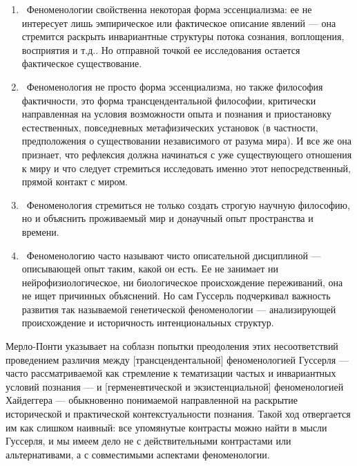 \documentclass[11pt]{book}
\begin{document}
\begin{enumerate}
  \item\ Феноменологии свойственна некоторая форма эссенциализма: ее не интересует лишь эмпирическое или фактическое описание явлений --- она стремится раскрыть инвариантные структуры потока сознания, воплощения, восприятия и т.д.. Но отправной точкой ее исследования остается фактическое существование.
  \item\ Феноменология не просто форма эссенциализма, но также философия фактичности, это форма трансцендентальной философии, критически направленная на условия возможности опыта и познания и приостановку естественных, повседневных метафизических установок (в частности, предположения о существовании независимого от разума мира). И все же она признает, что рефлексия должна начинаться с уже существующего отношения к миру и что следует стремиться исследовать именно этот непосредственный, прямой контакт с миром.
  \item\ Феноменология стремиться не только создать строгую научную философию, но и объяснить проживаемый мир и донаучный опыт пространства и времени.
  \item\ Феноменологию часто называют чисто описательной дисциплиной --- описывающей опыт таким, какой он есть. Ее не занимает ни нейрофизиологическое, ни биологическое происхождение переживаний, она не ищет причинных объяснений. Но сам Гуссерль подчеркивал важность развития так называемой генетической феноменологии --- анализирующей происхождение и историчность интенциональных структур.
\end{enumerate}

Мерло-Понти указывает на соблазн попытки преодоления этих несоответствий проведением различия между [трансцендентальной] феноменологией Гуссерля --- часто рассматриваемой как стремление к тематизации частых и инвариантных условий познания --- и [герменевтической и экзистенциальной] феноменологией Хайдеггера --- обыкновенно понимаемой направленной на раскрытие исторической и практической контекстуальности познания. Такой ход отвергается им как слишком наивный: все упомянутые контрасты можно найти в мысли Гуссерля, и мы имеем дело не с действительными контрастами или альтернативами, а с совместимыми аспектами феноменологии.
\end{document}
